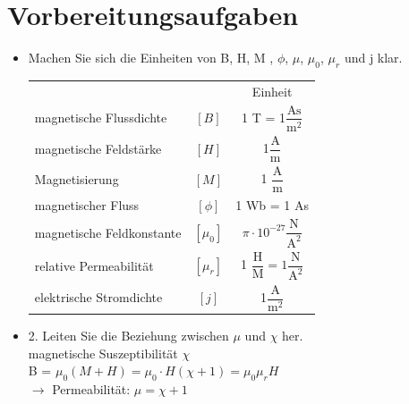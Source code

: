 \section{Vorbereitungsaufgaben}
\begin{itemize}
	\item  Machen Sie sich die Einheiten von B, H, M , $\phi$, $\mu$,  $\mu_0$, $\mu_r$ und j klar.
\newline
\begin{table}[h!]
	\begin{tabular}{lcc}
&& Einheit \\
magnetische Flussdichte&$ [B]$ &1 T = 1$\dfrac{\text{As}}{\text{m}^2}$\\
magnetische Feldstärke&$[H]$ & 1$\dfrac{\text{A} }{\text{m}}$ \\
Magnetisierung&$[M]$ & 1 $\dfrac{\text{A} }{\text{m}}$ \\
magnetischer Fluss&$[\phi]$ &  1 Wb = 1 As  \\
magnetische Feldkonstante&$[\mu_0]$ & $\pi \cdot 10^{-27}\dfrac{\text{N}}{\text{A}^2}$ \\
relative Permeabilität&$[\mu_r]$ & 1 $\dfrac{\text{H}}{\text{M}} = 1 \dfrac{\text{N}}{\text{A}^2}$\\
elektrische Stromdichte&$[j]$ & 1$\dfrac{\text{A}}{\text{m}^2}$

\end{tabular}
\end{table}
%


\item 2. Leiten Sie die Beziehung zwischen $\mu$ und $\chi$ her.\\
magnetische Suszeptibilität $\chi$\\
B = $\mu_0(M + H) = \mu_0 \cdot H (\chi + 1) = \mu_0\mu_rH$\\
$\rightarrow$ Permeabilität: $\mu = \chi + 1$


\end{itemize}
